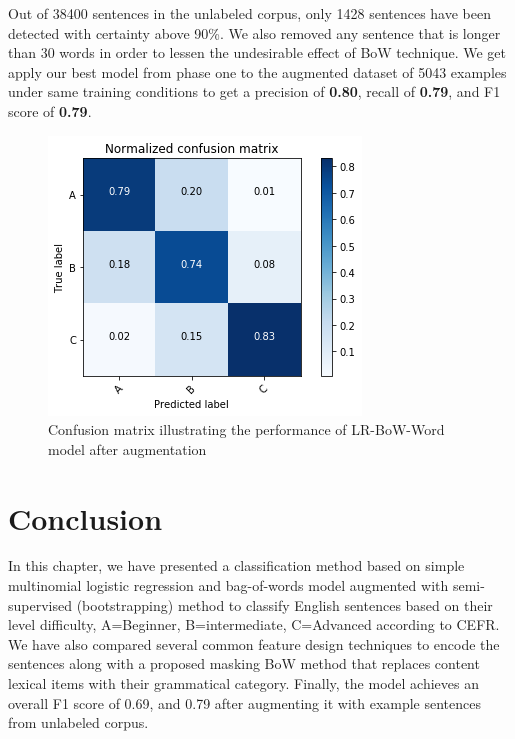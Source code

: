 Out of 38400 sentences in the unlabeled corpus, only 1428 sentences have been detected with certainty above 90\%. We also removed any sentence that is longer than 30 words in order to lessen the undesirable effect of BoW technique. We get apply our best model from phase one to the augmented dataset of 5043 examples under same training conditions to get a precision of \textbf{0.80}, recall of \textbf{0.79}, and F1 score of \textbf{0.79}. 

\begin{figure}[t]
	\centering
    \includegraphics[width=.75\linewidth]{../Figures/conf_matrix_iter2.png} 
	\caption{Confusion matrix illustrating the performance of LR-BoW-Word model after augmentation}
	\label{fig:cmdstudy}
\end{figure}

\section {Conclusion}
\label{sec:conclusion}
In this chapter, we have presented a classification method based on simple multinomial logistic regression and bag-of-words model augmented with semi-supervised (bootstrapping) method to classify English sentences based on their level difficulty, A=Beginner, B=intermediate, C=Advanced according to CEFR. We have also compared several common feature design techniques to encode the sentences along with a proposed masking BoW method that replaces content lexical items with their grammatical category. Finally, the model achieves an overall F1 score of 0.69, and 0.79 after augmenting it with example sentences from unlabeled corpus.
